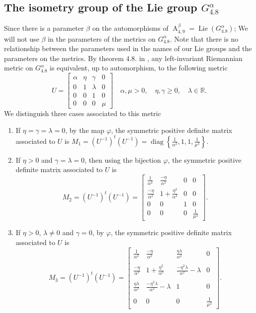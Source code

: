 \documentclass[12pt,a4paper,twoside]{article}
\theoremstyle{definition}
\begin{document}
\subsection{The isometry group of the Lie group $G_{4.8}^{\alpha}$}
Since there is a parameter $\beta$ on the automorphisms of $\operatorname{A}_{4, 9}^{\beta} = \operatorname{Lie}(G_{4.8}^{\alpha})$; We will not use $\beta$ in the parameters of the metrics on $G_{4.8}^{\alpha}$. Note that there is no relationship between the parameters used in the names of our Lie groups and the parameters on the metrics. By theorem 4.8. in \cite{aitbenhaddou2025classification}, any left-invariant Riemannian metric on $G_{4.8}^{\alpha}$ is equivalent, up to automorphism, to the following metric
$$U = \begin{bmatrix}
\alpha & \eta & \gamma  & 0\\
0 & 1 & \lambda & 0\\
0 & 0 & 1 & 0\\
0 & 0 & 0 & \mu
\end{bmatrix} \quad \alpha, \mu > 0, \quad \eta, \gamma \geq 0, \quad \lambda \in \mathbb{R}.$$
We distinguish three cases associated to this metric
\begin{enumerate}
\item If $\eta = \gamma = \lambda = 0$, by the map $\varphi$, the symmetric positive definite matrix associated to $U$ is $M_1 = (U^{-1})^t(U^{-1}) = \operatorname{diag}\left\lbrace \frac{1}{\alpha^2}, 1, 1, \frac{1}{\mu^2}\right\rbrace$.
\item If $\eta > 0$ and $\gamma = \lambda = 0$, then using the bijection $\varphi$, the symmetric positive definite matrix associated to $U$ is
$$M_2 = \left( U^{-1}\right)^t\left( U^{-1}\right) = \begin{bmatrix}
\frac{1}{\alpha^2} & \frac{-\eta}{\alpha^2} & 0 & 0\\
\frac{-\eta}{\alpha^2} & 1 + \frac{\eta^2}{\alpha^2} & 0 & 0\\
0 & 0 & 1 & 0\\
0 & 0 & 0 & \frac{1}{\mu^2}
\end{bmatrix}.$$
\item If $\eta > 0$, $\lambda \neq 0$ and $\gamma = 0$, by $\varphi$, the symmetric positive definite matrix associated to $U$ is
$$M_3 = \left( U^{-1}\right)^t\left( U^{-1}\right) = \begin{bmatrix}
\frac{1}{\alpha^2} & \frac{-\eta}{\alpha^2} & \frac{\eta\lambda}{\alpha^2} & 0\\
\\
\frac{-\eta}{\alpha^2} & 1 + \frac{\eta^2}{\alpha^2} & \frac{-\eta^2\lambda}{\alpha^2} - \lambda & 0\\
\\
\frac{\eta\lambda}{\alpha^2} & \frac{-\eta^2\lambda}{\alpha^2} - \lambda & 1 & 0\\
\\
0 & 0 & 0 & \frac{1}{\mu^2}
\end{bmatrix}.$$
\end{enumerate}
\end{document}
